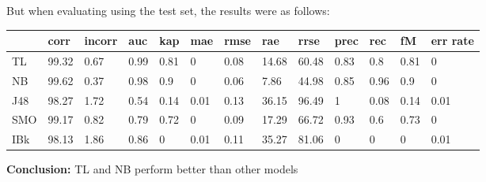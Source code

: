 \documentclass[a4paper,12pt, english]{article}
\begin{document}
But when evaluating using the test set, the results were as follows:
\begin{small}
\begin{center}
    \begin{tabular}{ | l | l | l | l | l | l | l | l | l | l | l | l | l |}
    \hline
      	& corr & incorr  & auc & kap & mae & rmse & rae & rrse & prec & rec & fM & err rate\\ \hline
      	TL & 99.32 & 0.67 & 0.99 & 0.81 & 0 & 0.08 & 14.68 & 60.48 & 0.83 & 0.8 & 0.81 & 0\\ \hline
	NB & 99.62 & 0.37 & 0.98 & 0.9 & 0 & 0.06 & 7.86 & 44.98 & 0.85 & 0.96 & 0.9 & 0\\ \hline
	J48 & 98.27 & 1.72 & 0.54 & 0.14 & 0.01 & 0.13 & 36.15 & 96.49 & 1 & 0.08 & 0.14 & 0.01\\ \hline
	SMO & 99.17 & 0.82 & 0.79 & 0.72 & 0 & 0.09 & 17.29 & 66.72 & 0.93 & 0.6 & 0.73 & 0\\ \hline
	IBk & 98.13 & 1.86 & 0.86 & 0 & 0.01 & 0.11 & 35.27 & 81.06 & 0 & 0 & 0 & 0.01\\ \hline  
    \end{tabular}       
\end{center}
\end{small}
\textbf{Conclusion:} TL and NB perform better than other models

\newpage
\end{document}
